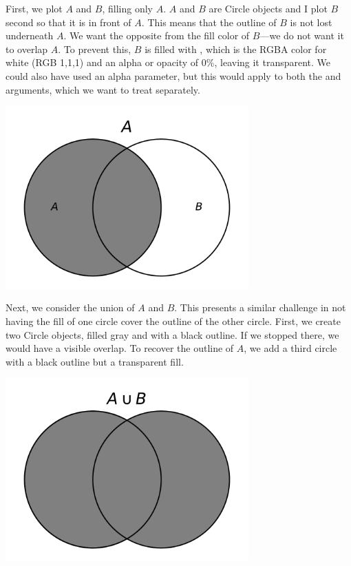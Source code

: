 First, we plot $A$ and $B$, filling only $A$. $A$ and $B$ are Circle objects and I plot $B$ second so that it is in front of $A$. This means that the outline of $B$ is not lost underneath $A$. We want the opposite from the fill color of $B$---we do not want it to overlap $A$. To prevent this, $B$ is filled with , which is the RGBA color for white (RGB 1,1,1) and an alpha or opacity of 0\%, leaving it transparent. We could also have used an alpha parameter, but this would apply to both the  and  arguments, which we want to treat separately. 


\begin{center}
    \includegraphics[width = 0.7\textwidth]{figures/specialplots/event-A.pdf}
\end{center}

Next, we consider the union of $A$ and $B$. This presents a similar challenge in not having the fill of one circle cover the outline of the other circle. First, we create two Circle objects, filled gray and with a black outline.  If we stopped there, we would have a visible overlap. To recover the outline of $A$, we add a third circle with a black outline but a transparent fill. 


\begin{center}
    \includegraphics[width = 0.7\textwidth]{figures/specialplots/union.pdf}
\end{center}



